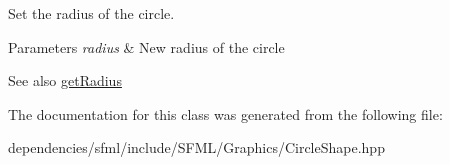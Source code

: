 Set the radius of the circle. 


\begin{DoxyParams}{Parameters}
{\em radius} & New radius of the circle\\
\hline
\end{DoxyParams}
\begin{DoxySeeAlso}{See also}
\hyperlink{classsf_1_1_circle_shape_aa3dd5a1b5031486ce5b6f09d43674aa3}{get\+Radius} 
\end{DoxySeeAlso}


The documentation for this class was generated from the following file\+:\begin{DoxyCompactItemize}
\item 
dependencies/sfml/include/\+S\+F\+M\+L/\+Graphics/Circle\+Shape.\+hpp\end{DoxyCompactItemize}
